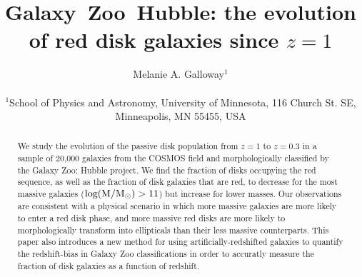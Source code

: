 \documentclass[useAMS,usenatbib]{mn2e}
\begin{document}
\title[Galaxy~Zoo: passive disk fraction]{Galaxy~Zoo~Hubble: the evolution of red disk galaxies since $z=1$}
\author[Galloway et~al.]{\parbox[t]{16cm}{Melanie A. Galloway$^1$
\vspace{0.1in} }\\
$^{1}$School of Physics and Astronomy, University of Minnesota, 116 Church St. SE, Minneapolis, MN 55455, USA\\
   }
\maketitle

\begin{abstract}
We study the evolution of the passive disk population from $z=1$ to $z=0.3$ in a sample of 20,000 galaxies from the COSMOS field and morphologically classified by the Galaxy Zoo: Hubble project. We find the fraction of disks occupying the red sequence, as well as the fraction of disk galaxies that are red, to decrease for the most massive galaxies ($\rm log(M/M_{\odot})>11$) but increase for lower masses. Our observations are consistent with a physical scenario in which more massive galaxies are more likely to enter a red disk phase, and more massive red disks are more likely to morphologically transform into ellipticals than their less massive counterparts. This paper also introduces a new method for using artificially-redshifted galaxies to quantify the redshift-bias in Galaxy Zoo classifications in order to accuratly measure the fraction of disk galaxies as a function of redshift.  


\end{abstract}
\end{document}
